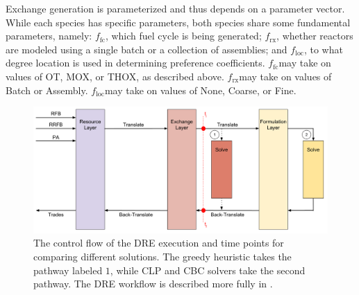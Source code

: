 \documentclass{anstrans}
\newcommand{\ffc}{$f_{\text{fc}}$}
\newcommand{\frx}{$f_{\text{rx}}$}
\newcommand{\floc}{$f_{\text{loc}}$}
\begin{document}
Exchange generation is parameterized and thus depends on a parameter
vector. While each species has specific parameters, both species share some
fundamental parameters, namely: \ffc, which fuel cycle is being generated; \frx,
whether reactors are modeled using a single batch or a collection of assemblies;
and \floc, to what degree location is used in determining preference
coefficients. \ffc may take on values of OT, MOX, or THOX, as described
above. \frx may take on values of Batch or Assembly. \floc may take on values of
None, Coarse, or Fine.


\begin{figure}
  \begin{center}
    \includegraphics[width=2\columnwidth]{exchange_xlation_timing.pdf}
    \caption[]{
      \label{fig:dre_time}
      The control flow of the DRE execution and time points for comparing
      different solutions. The greedy heuristic takes the pathway labeled $1$,
      while CLP and CBC solvers take the second pathway. The DRE workflow is
      described more fully in \cite{gidden_agent-based_2013,
        gidden_agent-based_2014}. }
  \end{center}
\end{figure}
\end{document}
